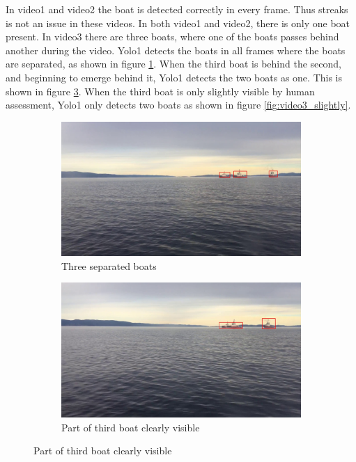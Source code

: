 \newpage

In video1 and video2 the boat is detected correctly in every frame. Thus streaks is not an issue in these videos. In both video1 and video2, there is only one boat present. In video3 there are three boats, where one of the boats passes behind another during the video. Yolo1 detects the boats in all frames where the boats are separated, as shown in figure \ref{fig:video3_sep}. When the third boat is behind the second, and beginning to emerge behind it, Yolo1 detects the two boats as one. This is shown in figure \ref{fig:video3_bigboat}. When the third boat is only slightly visible by human assessment, Yolo1 only detects two boats as shown in figure \ref{fig:video3_slightly}. 

\begin{figure}[h!]
\centering
\begin{subfigure}[b]{0.78\textwidth}
   \includegraphics[width=1\linewidth]{results/video/video3/frame677.jpg}
   \caption{Three separated boats}
   \label{fig:video3_sep} 
\end{subfigure}

\begin{subfigure}[b]{0.78\textwidth}
   \includegraphics[width=1\linewidth]{results/video/video3/frame479.jpg}
   \caption{Part of third boat clearly visible}
   \label{fig:video3_bigboat}
\end{subfigure}


\end{figure}
